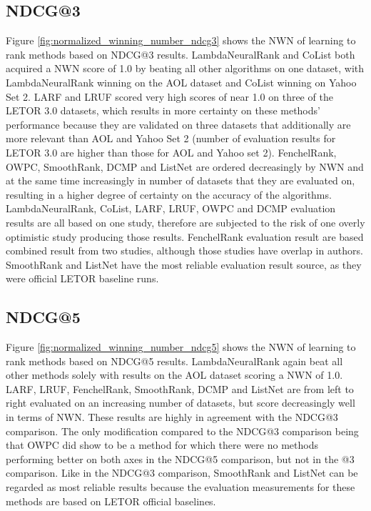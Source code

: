 \documentclass{sig-alternate}
\begin{document}
\subsection{NDCG@3}
Figure \ref{fig:normalized_winning_number_ndcg3} shows the NWN of learning to rank methods based on NDCG@3 results. LambdaNeuralRank and CoList both acquired a NWN score of 1.0 by beating all other algorithms on one dataset, with LambdaNeuralRank winning on the AOL dataset and CoList winning on Yahoo Set 2. LARF and LRUF scored very high scores of near 1.0 on three of the LETOR 3.0 datasets, which results in more certainty on these methods' performance because they are validated on three datasets that additionally are more relevant than AOL and Yahoo Set 2 (number of evaluation results for LETOR 3.0 are higher than those for AOL and Yahoo set 2). FenchelRank, OWPC, SmoothRank, DCMP and ListNet are ordered decreasingly by NWN and at the same time increasingly in number of datasets that they are evaluated on, resulting in a higher degree of certainty on the accuracy of the algorithms.\\

LambdaNeuralRank, CoList, LARF, LRUF, OWPC and DCMP evaluation results are all based on one study, therefore are subjected to the risk of one overly optimistic study producing those results. FenchelRank evaluation result are based combined result from two studies, although those studies have overlap in authors. SmoothRank and ListNet have the most reliable evaluation result source, as they were official LETOR baseline runs.  

\subsection{NDCG@5}
Figure \ref{fig:normalized_winning_number_ndcg5} shows the NWN of learning to rank methods based on NDCG@5 results. LambdaNeuralRank again beat all other methods solely with results on the AOL dataset scoring a NWN of 1.0. LARF, LRUF, FenchelRank, SmoothRank, DCMP and ListNet are from left to right evaluated on an increasing number of datasets, but score decreasingly well in terms of NWN. These results are highly in agreement with the NDCG@3 comparison. The only modification compared to the NDCG@3 comparison being that OWPC did show to be a method for which there were no methods performing better on both axes in the NDCG@5 comparison, but not in the @3 comparison. Like in the NDCG@3 comparison, SmoothRank and ListNet can be regarded as most reliable results because the evaluation measurements for these methods are based on LETOR official baselines.
\end{document}
